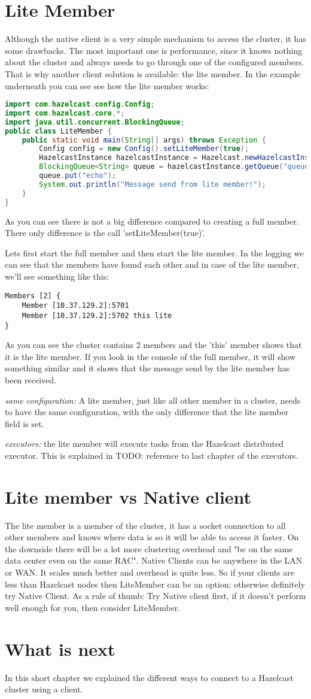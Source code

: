 \section{Lite Member}
Although the native client is a very simple mechanism to access the cluster, it has some drawbacks. The most important one is performance, since it knows nothing about the cluster and always needs to go through one of the configured members. That is why another client solution is available: the lite member. In the example underneath you can see see how the lite member works:
\begin{lstlisting}[language=java]
import com.hazelcast.config.Config;
import com.hazelcast.core.*;
import java.util.concurrent.BlockingQueue;
public class LiteMember {
    public static void main(String[] args) throws Exception {
        Config config = new Config().setLiteMember(true);
        HazelcastInstance hazelcastInstance = Hazelcast.newHazelcastInstance(config);
        BlockingQueue<String> queue = hazelcastInstance.getQueue("queue");
        queue.put("echo");
        System.out.println("Message send from lite member!");
    }
}
\end{lstlisting}
As you can see there is not a big difference compared to creating a full member. There only difference is the call 'setLiteMember(true)'. 

Lets first start the full member and then start the lite member. In the logging we can see that the members have found each other and in case of the lite member, we'll see something like this:
\begin{verbatim}
Members [2] {
    Member [10.37.129.2]:5701
    Member [10.37.129.2]:5702 this lite
}	
\end{verbatim}	
As you can see the cluster contains 2 members and the 'this' member shows that it is the lite member. If you look in the console of the full member, it will show something similar and it shows that the message send by the lite member has been received.

\emph{same configuration:} A lite member, just like all other member in a cluster, needs to have the same configuration, with the only difference that the lite member field is set. 

\emph{executors:} the lite member will execute tasks from the Hazelcast distributed executor. This is explained in TODO: reference to last chapter of the executors.

\section{Lite member vs Native client}
The lite member is a member of the cluster, it has a socket connection to all other members and knows where data is so it will be able to access it faster. On the downside there will be a lot more clustering overhead and "be on the same data center even on the same RAC". Native Clients can be anywhere in the LAN or WAN. It scales much better and overhead is quite less. So if your clients are less than Hazelcast nodes then LiteMember can be an option; otherwise definitely try Native Client. As a rule of thumb: Try Native client first, if it doesn't perform well enough for you, then consider LiteMember.

\section{What is next}
In this short chapter we explained the different ways to connect to a Hazelcast cluster using a client.